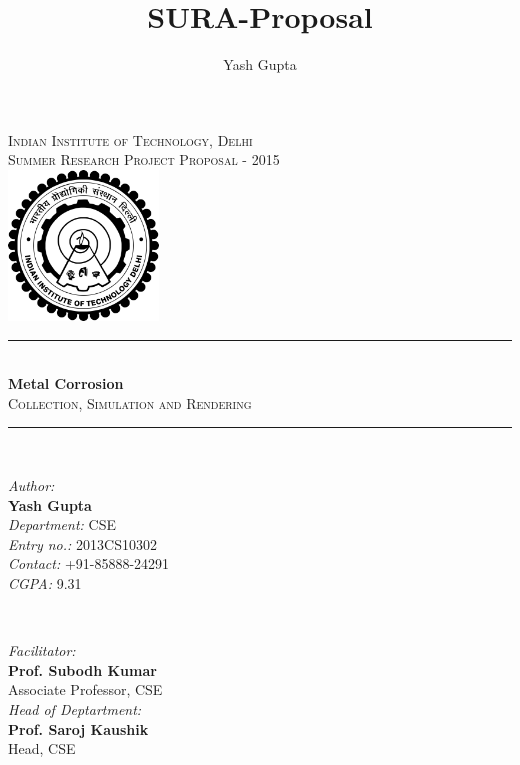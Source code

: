 \documentclass[12pt]{article}
\title{SURA-Proposal}
\author{Yash Gupta}
\begin{document}
\begin{titlepage}

\newcommand{\HRule}{\rule{\linewidth}{0.5mm}} %

\center %

\textsc{\LARGE Indian Institute of Technology, Delhi}\\[1.0cm] 
\textsc{\Large Summer Research Project Proposal - 2015}\\[1.0cm] 
\includegraphics[height=4cm]{iitd_logo.png}\\[2.0cm] 
\HRule \\[0.5cm]
{ \huge \bfseries Metal Corrosion}\\[0.4cm] %
\textsc{\large Collection, Simulation and Rendering}\\[0.2cm] %
\HRule \\[3.5cm]
 

\begin{minipage}{0.45\textwidth}
\begin{flushleft} \large
\emph{Author:}\\
\textbf{Yash Gupta}\\
\emph{Department:} CSE\\
\emph{Entry no.:} 2013CS10302\\
\emph{Contact:} +91-85888-24291\\
\emph{CGPA:} 9.31
\end{flushleft}
\end{minipage}
~
\begin{minipage}{0.45\textwidth}
\begin{flushright} \large
\emph{Facilitator:} \\
\textbf{Prof. Subodh Kumar}\\
Associate Professor, CSE\\[0.5cm]
\emph{Head of Deptartment:}\\
\textbf{Prof. Saroj Kaushik}\\
Head, CSE
\end{flushright}
\end{minipage}\\[1cm]

\vfill %

\end{titlepage}
\end{document}
